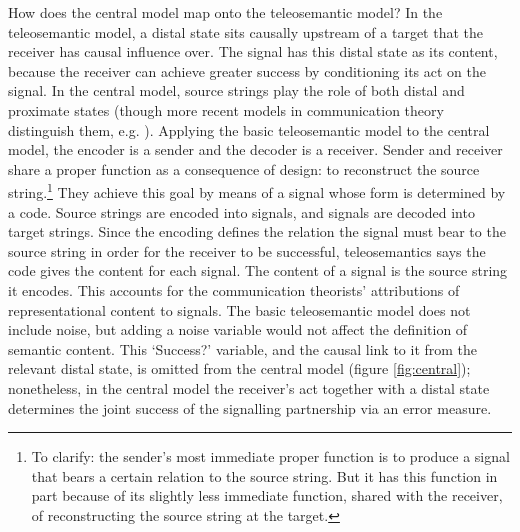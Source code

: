 \documentclass[12pt]{article}
\begin{document}
How does the central model map onto the teleosemantic model? 
In the teleosemantic model, a distal state sits causally upstream of a target that the receiver has causal influence over.
The signal has this distal state as its content, because the receiver can achieve greater success by conditioning its act on the signal.
In the central model, source strings play the role of both distal and proximate states (though more recent models in communication theory distinguish them, e.g. \citet{berger1996ceo}).
Applying the basic teleosemantic model to the central model, the encoder is a sender and the decoder is a receiver.
Sender and receiver share a proper function as a consequence of design: to reconstruct the source string.\footnote{To clarify: the sender's most immediate proper function is to produce a signal that bears a certain relation to the source string. But it has this function in part because of its slightly less immediate function, shared with the receiver, of reconstructing the source string at the target.}
They achieve this goal by means of a signal whose form is determined by a code.
Source strings are encoded into signals, and signals are decoded into target strings.
Since the encoding defines the relation the signal must bear to the source string in order for the receiver to be successful, teleosemantics says the code gives the content for each signal.
The content of a signal is the source string it encodes.
This accounts for the communication theorists' attributions of representational content to signals.
The basic teleosemantic model does not include noise, but adding a noise variable would not affect the definition of semantic content.
This `Success?' variable, and the causal link to it from the relevant distal state, is omitted from the central model (figure \ref{fig:central}); nonetheless, in the central model the receiver's act together with a distal state determines the joint success of the signalling partnership via an error measure.
\end{document}
